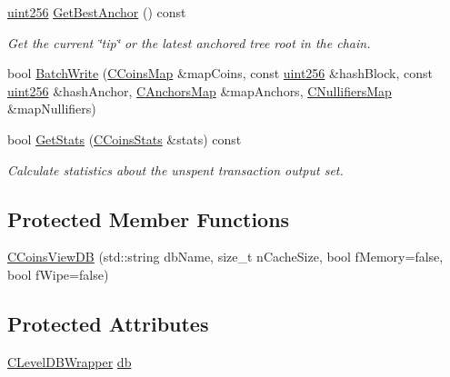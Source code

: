 \begin{DoxyCompactItemize}
\mbox{\hyperlink{classuint256}{uint256}} \mbox{\hyperlink{class_c_coins_view_d_b_a2bb7d73a96472def92e332a4563a689c}{Get\+Best\+Anchor}} () const
\begin{DoxyCompactList}\small\item\em Get the current \char`\"{}tip\char`\"{} or the latest anchored tree root in the chain. \end{DoxyCompactList}\item 
bool \mbox{\hyperlink{class_c_coins_view_d_b_ab617e4b898f06cec79a2a26fdca9efbd}{Batch\+Write}} (\mbox{\hyperlink{coins_8h_a2886ba2fd0428bae777e1cbcabc02834}{C\+Coins\+Map}} \&map\+Coins, const \mbox{\hyperlink{classuint256}{uint256}} \&hash\+Block, const \mbox{\hyperlink{classuint256}{uint256}} \&hash\+Anchor, \mbox{\hyperlink{coins_8h_a070827cc9d21a91b8f4f4f52a6f7c848}{C\+Anchors\+Map}} \&map\+Anchors, \mbox{\hyperlink{coins_8h_ab651cc287e9594190ef77d2fca2b14c7}{C\+Nullifiers\+Map}} \&map\+Nullifiers)
\item 
bool \mbox{\hyperlink{class_c_coins_view_d_b_a227bf56f8801921f12e56c6839104fce}{Get\+Stats}} (\mbox{\hyperlink{struct_c_coins_stats}{C\+Coins\+Stats}} \&stats) const
\begin{DoxyCompactList}\small\item\em Calculate statistics about the unspent transaction output set. \end{DoxyCompactList}\end{DoxyCompactItemize}
\subsection*{Protected Member Functions}
\begin{DoxyCompactItemize}
\item 
\mbox{\hyperlink{class_c_coins_view_d_b_a77de349a6beacdf07f0e4aab1bbdecbc}{C\+Coins\+View\+DB}} (std\+::string db\+Name, size\+\_\+t n\+Cache\+Size, bool f\+Memory=false, bool f\+Wipe=false)
\end{DoxyCompactItemize}
\subsection*{Protected Attributes}
\begin{DoxyCompactItemize}
\item 
\mbox{\hyperlink{class_c_level_d_b_wrapper}{C\+Level\+D\+B\+Wrapper}} \mbox{\hyperlink{class_c_coins_view_d_b_aba0a7b26fe82c1a2e80ca060d12fb66a}{db}}
\end{DoxyCompactItemize}


